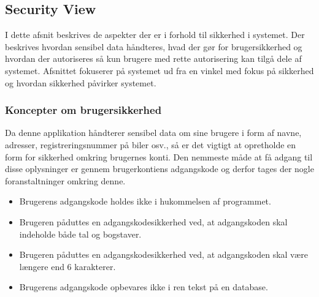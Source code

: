\documentclass[Arkitektur/System_main.tex]{subfiles}
\begin{document}
\subsection{Security View}
I dette afsnit beskrives de aspekter der er i forhold til sikkerhed i systemet. Der beskrives hvordan sensibel data håndteres, hvad der gør for brugersikkerhed og hvordan der autoriseres så kun brugere med rette autorisering kan tilgå dele af systemet. Afsnittet fokuserer på systemet ud fra en vinkel med fokus på sikkerhed og hvordan sikkerhed påvirker systemet.
\subsubsection{Koncepter om brugersikkerhed}
Da denne applikation håndterer sensibel data om sine brugere i form af navne, adresser, registreringsnummer på biler osv., så er det vigtigt at opretholde en form for sikkerhed omkring brugernes konti. Den nemmeste måde at få adgang til disse oplysninger er gennem brugerkontiens adgangskode og derfor tages der nogle foranstaltninger omkring denne. \begin{itemize}
    \item Brugerens adgangskode holdes ikke i hukommelsen af programmet. 
    \item Brugeren påduttes en adgangskodesikkerhed ved, at adgangskoden skal indeholde både tal og bogstaver.
    \item Brugeren påduttes en adgangskodesikkerhed ved, at adgangskoden skal være længere end 6 karakterer.
    \item Brugerens adgangskode opbevares ikke i ren tekst på en database.
\end{itemize}
\end{document}
